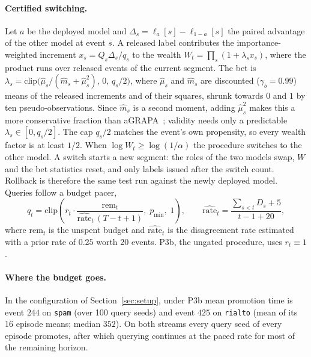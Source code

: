 \documentclass[10pt]{article}
\begin{document}
\paragraph{Certified switching.} Let $a$ be the deployed model and $\Delta_s=\ell_a[s]-\ell_{1-a}[s]$
the paired advantage of the other model at event $s$. A released label contributes the
importance-weighted increment $x_s=Q_s\Delta_s/q_s$ to the wealth $W_t=\prod_{s}(1+\lambda_s x_s)$,
where the product runs over released events of the current segment. The bet is
$\lambda_s=\mathrm{clip}\bigl(\hat\mu_s/(\hat m_s+\hat\mu^2_s),\,0,\,q_s/2\bigr)$, where
$\hat\mu_s$ and $\hat m_s$ are discounted ($\gamma_b=0.99$) means of the released increments and
of their squares, shrunk towards $0$ and $1$ by ten pseudo-observations. Since $\hat m_s$ is a
second moment, adding $\hat\mu_s^2$ makes this a more conservative fraction than
aGRAPA~\citep{waudbysmith2024betting}; validity needs only a predictable
$\lambda_s\in[0,q_s/2]$. The cap $q_s/2$ matches the
event's own propensity, so every wealth factor is at least $1/2$. When $\log W_t\ge\log(1/\alpha)$
the procedure switches to the other model. A switch starts a new segment: the roles of the two models
swap, $W$ and the bet statistics reset, and only labels issued after the switch count. Rollback is
therefore the same test run against the newly deployed model. Queries follow a budget pacer,
\begin{equation}\label{eq:pace}
  q_t=\mathrm{clip}\!\left(r_t\cdot\frac{\mathrm{rem}_t}{\widehat{\text{rate}}_t\,(T-t+1)},\;
  p_{\min},\;1\right),\qquad
  \widehat{\text{rate}}_t=\frac{\sum_{s<t}D_s+5}{t-1+20},
\end{equation}
where $\mathrm{rem}_t$ is the unspent budget and $\widehat{\text{rate}}_t$ is the disagreement rate
estimated with a prior rate of $0.25$ worth 20 events. \textsf{P3b}, the ungated procedure, uses
$r_t\equiv1$.

\paragraph{Where the budget goes.} In the configuration of Section~\ref{sec:setup}, under
\textsf{P3b} mean promotion time is event $244$ on
\texttt{spam} (over 100 query seeds) and event $425$ on \texttt{rialto} (mean of its 16 episode
means; median $352$). On both streams every query seed of every episode promotes, after which querying continues at the
paced rate for most of the remaining horizon.
\end{document}
